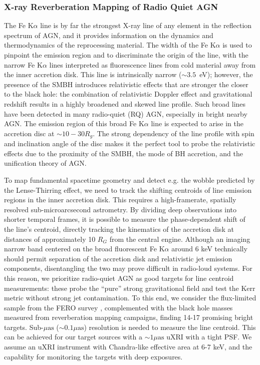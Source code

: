 \documentclass[fleqn,10pt]{SelfArx}
\begin{document}
\subsubsection{X-ray Reverberation Mapping of Radio Quiet AGN}\label{subsubsec:reverberation}

The Fe K$\alpha$ line is by far the strongest X-ray line of any element in the reflection spectrum of AGN, and it provides information on the dynamics and thermodynamics of the reprocessing material. The width of the Fe K$\alpha$ is used to pinpoint the emission region and to discriminate the origin of the line, with the narrow Fe K$\alpha$ lines interpreted as fluorescence lines from cold material away from the inner accretion disk.
This line is intrinsically narrow ($\sim 3.5$~eV); however, the presence of the SMBH introduces relativistic effects that are stronger the closer to the black hole: the combination of relativistic Doppler effect and gravitational redshift results in a highly broadened and skewed line profile. Such broad lines have been detected in many radio-quiet  (RQ) AGN, especially in bright nearby AGN. The emission region of this broad Fe K$\alpha$ line is expected to arise in the accretion disc at $\sim 10-30 R_g$.
The strong dependency of the line profile with spin and inclination angle of the disc makes it the perfect tool to probe the relativistic effects due to the proximity of the SMBH, the mode of BH accretion, and the unification theory of AGN.

To map fundamental spacetime geometry and detect e.g. the wobble predicted by the Lense-Thirring effect, we need to track the shifting centroids of line emission regions in the inner accretion disk. This requires a high-framerate, spatially resolved sub-microarcsecond astrometry. 
By dividing deep observations into shorter temporal frames, it is possible to measure the phase-dependent shift of the line's centroid, directly tracking the kinematics of the accretion disk at distances of approximately 10 $R_G$ from the central engine. Although an imaging narrow band centered on the broad fluorescent Fe K$\alpha$ around 6 keV technically should permit separation of the accretion disk and relativistic jet emission components, disentangling the two may prove difficult in radio-loud systems.
For this reason, we prioritize radio-quiet AGN as good targets for line centroid measurements: these probe the ``pure'' strong gravitational field and test the Kerr metric without strong jet contamination. To this end, we consider the flux-limited sample from the FERO survey \citep{FERO2010}, complemented with the black hole masses measured from reverberation mapping campaigns, finding 14-17 promising bright targets.  
Sub-$\mu\text{as}$ ($\sim 0.1\mu\text{as}$) resolution is needed to measure the line centroid. This can be achieved for our target sources with a $\sim 1 \mu\text{as}$ uXRI with a tight PSF. We assume an uXRI instrument with Chandra-like effective area at 6-7 keV, and the capability for monitoring the targets with deep exposures.
\end{document}
